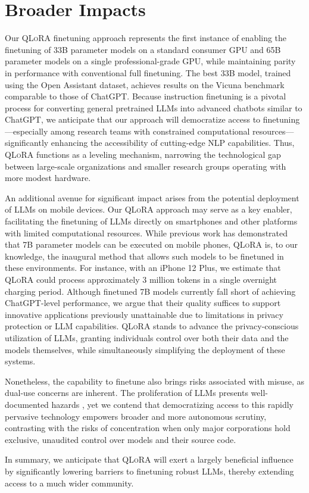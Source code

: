 \section{Broader Impacts}

Our \textsc{QLoRA} finetuning approach represents the first instance of enabling the finetuning of 33B parameter models on a standard consumer GPU and 65B parameter models on a single professional-grade GPU, while maintaining parity in performance with conventional full finetuning. The best 33B model, trained using the Open Assistant dataset, achieves results on the Vicuna benchmark comparable to those of ChatGPT. Because instruction finetuning is a pivotal process for converting general pretrained LLMs into advanced chatbots similar to ChatGPT, we anticipate that our approach will democratize access to finetuning—especially among research teams with constrained computational resources—significantly enhancing the accessibility of cutting-edge NLP capabilities. Thus, \textsc{QLoRA} functions as a leveling mechanism, narrowing the technological gap between large-scale organizations and smaller research groups operating with more modest hardware.

An additional avenue for significant impact arises from the potential deployment of LLMs on mobile devices. Our \textsc{QLoRA} approach may serve as a key enabler, facilitating the finetuning of LLMs directly on smartphones and other platforms with limited computational resources. While previous work has demonstrated that 7B parameter models can be executed on mobile phones, \textsc{QLoRA} is, to our knowledge, the inaugural method that allows such models to be finetuned in these environments. For instance, with an iPhone 12 Plus, we estimate that \textsc{QLoRA} could process approximately 3 million tokens in a single overnight charging period. Although finetuned 7B models currently fall short of achieving ChatGPT-level performance, we argue that their quality suffices to support innovative applications previously unattainable due to limitations in privacy protection or LLM capabilities. \textsc{QLoRA} stands to advance the privacy-conscious utilization of LLMs, granting individuals control over both their data and the models themselves, while simultaneously simplifying the deployment of these systems.

Nonetheless, the capability to finetune also brings risks associated with misuse, as dual-use concerns are inherent. The proliferation of LLMs presents well-documented hazards \citep{bommasani2021opportunities,bender2021dangers}, yet we contend that democratizing access to this rapidly pervasive technology empowers broader and more autonomous scrutiny, contrasting with the risks of concentration when only major corporations hold exclusive, unaudited control over models and their source code.

In summary, we anticipate that \textsc{QLoRA} will exert a largely beneficial influence by significantly lowering barriers to finetuning robust LLMs, thereby extending access to a much wider community.